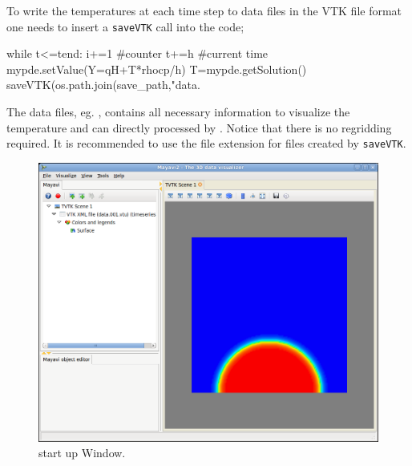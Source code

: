 To write the temperatures at each time step to data files in the VTK file format one
needs to insert a \verb|saveVTK| call into the code;
\begin{python}
while t<=tend:
      i+=1 #counter
      t+=h #current time
      mypde.setValue(Y=qH+T*rhocp/h)
      T=mypde.getSolution()
      saveVTK(os.path.join(save_path,"data.%
\end{python}
The data files, eg. , contains all necessary information to 
visualize the temperature and can directly processed by \mayavi. Notice that there is no 
regridding required. It is recommended to use the file extension  for files
created by \verb|saveVTK|. 

\begin{figure}[ht]
\centerline{\includegraphics[width=4.in]{figures/ScreeshotMayavi2n1}}
\caption{\mayavi start up Window.}
\label{fig:mayavi window}
\end{figure}

